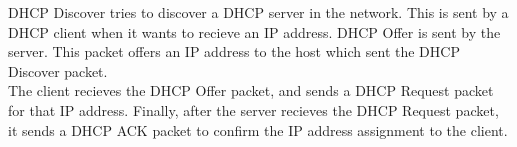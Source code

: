 DHCP Discover tries to discover a DHCP server in the network. This is sent by a DHCP client when it wants to recieve an IP address. DHCP Offer is sent by the server. This packet offers an IP address to the host which sent the DHCP Discover packet. \\
The client recieves the DHCP Offer packet, and sends a DHCP Request packet for that IP address. Finally, after the server recieves the DHCP Request packet, it sends a DHCP ACK packet to confirm the IP address assignment to the client.
